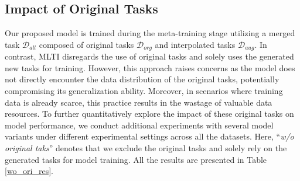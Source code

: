 \subsection{Impact of Original Tasks}
\label{ori_task}
Our proposed model is trained during the meta-training stage utilizing a merged task $\mathcal{D}_{all}$ composed of original tasks $\mathcal{D}_{org}$ and interpolated tasks $\mathcal{D}_{aug}$. In contrast, MLTI disregards the use of original tasks and solely uses the generated new tasks for training. However, this approach raises concerns as the model does not directly encounter the data distribution of the original tasks, potentially compromising its generalization ability. Moreover, in scenarios where training data is already scarce, this practice results in the wastage of valuable data resources. To further quantitatively explore the impact of these original tasks on model performance, we conduct additional experiments with several model variants under different experimental settings across all the datasets. Here, ``\textit{w/o original taks}'' denotes that we exclude the original tasks and solely rely on the generated tasks for model training. All the results are presented in Table \ref{wo_ori_res}.


